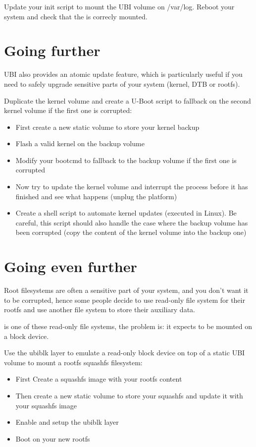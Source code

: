 Update your init script to mount the UBI  volume on /var/log.
Reboot your system and check that the  is correcly mounted.

%
%


\section{Going further}

UBI also provides an atomic update feature, which is particularly useful
if you need to safely upgrade sensitive parts of your system (kernel,
DTB or rootfs).

Duplicate the kernel volume and create a U-Boot script to fallback on
the second kernel volume if the first one is corrupted:
\begin{itemize}
  \item First create a new static volume to store your kernel backup
  \item Flash a valid kernel on the backup volume
  \item Modify your bootcmd to fallback to the backup volume if the first one
    is corrupted
  \item Now try to update the kernel volume and interrupt the process before
    it has finished and see what happens (unplug the platform)
  \item Create a shell script to automate kernel updates (executed in Linux).
    Be careful, this script should also handle the case where the backup
    volume has been corrupted (copy the content of the kernel volume into
    the backup one)
\end{itemize}


\section{Going even further}

Root filesystems are often a sensitive part of your system, and you don't
want it to be corrupted, hence some people decide to use read-only
file system for their rootfs and use another file system to store their
auxiliary data.

 is one of these read-only file systems, the problem is:
it expects to be mounted on a block device.

Use the ubiblk layer to emulate a read-only block device on top of a static
UBI volume to mount a rootfs squashfs filesystem:
\begin{itemize}
  \item First Create a squashfs image with your rootfs content
  \item Then create a new static volume to store your squashfs and update it with
    your squashfs image
  \item Enable and setup the ubiblk layer
  \item Boot on your new rootfs
\end{itemize}


